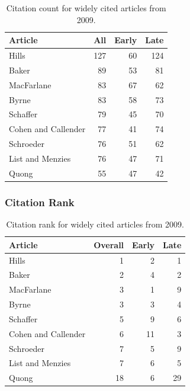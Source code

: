 \documentclass[
  10pt,
  letterpaper,
  DIV=11,
  numbers=noendperiod,
  twoside]{scrartcl}
\begin{document}
\begin{longtable}[]{@{}lrrr@{}}

\caption{\label{tbl-citation-count-2009}Citation count for widely cited
articles from 2009.}

\tabularnewline

\toprule\noalign{}
Article & All & Early & Late \\
\midrule\noalign{}
\endhead
\bottomrule\noalign{}
\endlastfoot
Hills & 127 & 60 & 124 \\
Baker & 89 & 53 & 81 \\
MacFarlane & 83 & 67 & 62 \\
Byrne & 83 & 58 & 73 \\
Schaffer & 79 & 45 & 70 \\
Cohen and Callender & 77 & 41 & 74 \\
Schroeder & 76 & 51 & 62 \\
List and Menzies & 76 & 47 & 71 \\
Quong & 55 & 47 & 42 \\

\end{longtable}

\subsubsection*{Citation Rank}\label{citation-rank-33}

\begin{longtable}[]{@{}lrrr@{}}

\caption{\label{tbl-citation-rank-2009}Citation rank for widely cited
articles from 2009.}

\tabularnewline

\toprule\noalign{}
Article & Overall & Early & Late \\
\midrule\noalign{}
\endhead
\bottomrule\noalign{}
\endlastfoot
Hills & 1 & 2 & 1 \\
Baker & 2 & 4 & 2 \\
MacFarlane & 3 & 1 & 9 \\
Byrne & 3 & 3 & 4 \\
Schaffer & 5 & 9 & 6 \\
Cohen and Callender & 6 & 11 & 3 \\
Schroeder & 7 & 5 & 9 \\
List and Menzies & 7 & 6 & 5 \\
Quong & 18 & 6 & 29 \\

\end{longtable}
\end{document}
